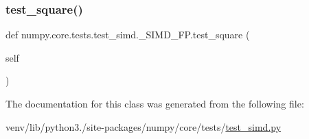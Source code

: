 \subsubsection{\texorpdfstring{test\+\_\+square()}{test\_square()}}
{\footnotesize\ttfamily def numpy.\+core.\+tests.\+test\+\_\+simd.\+\_\+\+S\+I\+M\+D\+\_\+\+F\+P.\+test\+\_\+square (\begin{DoxyParamCaption}\item[{}]{self }\end{DoxyParamCaption})}



The documentation for this class was generated from the following file\+:\begin{DoxyCompactItemize}
\item 
venv/lib/python3./site-\/packages/numpy/core/tests/\hyperlink{test__simd_8py}{test\+\_\+simd.\+py}\end{DoxyCompactItemize}
